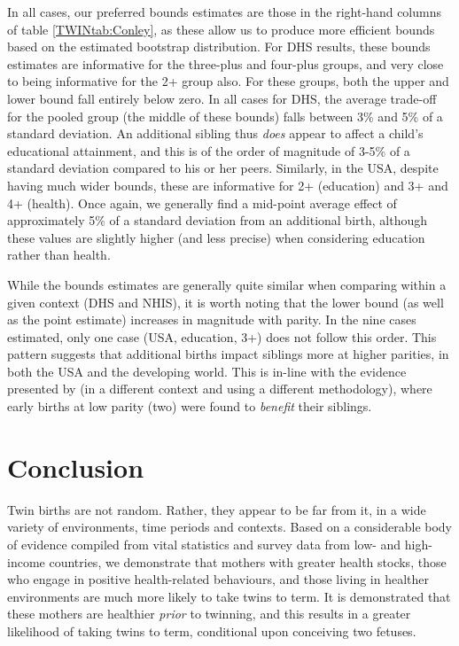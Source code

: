 In all cases, our preferred bounds estimates are those in the right-hand
columns of table \ref{TWINtab:Conley}, as these allow us to produce more
efficient bounds based on the estimated bootstrap distribution.  For DHS
results, these bounds estimates are informative for the three-plus and 
four-plus groups, and very close to being informative for the 2+ group also.  
For these groups, both the upper and lower bound fall entirely below zero. In
all cases for DHS, the average trade-off for the pooled group (the middle of
these bounds) falls between 3\% and 5\% of a standard deviation.  An additional
sibling thus \emph{does} appear to affect a child's educational attainment,
and this is of the order of magnitude of 3-5\% of a standard deviation compared
to his or her peers.  Similarly, in the USA, despite having much wider bounds,
these are informative for 2+ (education) and 3+ and 4+ (health).  Once again,
we generally find a mid-point average effect of approximately 5\% of a 
standard deviation from an additional birth, although these values are slightly
higher (and less precise) when considering education rather than health.

While the bounds estimates are generally quite similar when comparing within
a given context (DHS and NHIS), it is worth noting that the lower bound (as
well as the point estimate) increases in magnitude with parity.  In the nine
cases estimated, only one case (USA, education, 3+) does not follow this order.
This pattern suggests that additional births impact siblings more at higher
parities, in both the USA and the developing world.  This is in-line with the
evidence presented by \citet{Qian2009} (in a different context and using a 
different methodology), where early births at low parity (two) were found to 
\emph{benefit} their siblings.

\section{Conclusion}                               \label{TWINscn:conclusion}
Twin births are not random.  Rather, they appear to be far from it, in a wide
variety of environments, time periods and contexts.  Based on a considerable 
body of evidence compiled from vital statistics and survey data from low- and 
high-income countries, we demonstrate that mothers with greater health stocks,
those who engage in positive health-related behaviours, and those living in 
healther environments are much more likely to take twins to term.  It is 
demonstrated that these mothers are healthier \emph{prior} to twinning, and
this results in a greater likelihood of taking twins to term, conditional upon
conceiving two fetuses.

